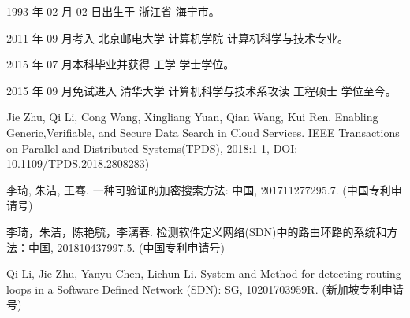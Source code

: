 \begin{resume}


  1993 年 02 月 02 日出生于 浙江省 海宁市。

  2011 年 09 月考入 北京邮电大学 计算机学院 计算机科学与技术专业。

  2015 年 07 月本科毕业并获得 工学 学士学位。

  2015 年 09 月免试进入 清华大学 计算机科学与技术系攻读 工程硕士 学位至今。



  \begin{publications}[before=\publicationskip,after=\publicationskip]
    \item Jie Zhu, Qi Li, Cong Wang, Xingliang Yuan, Qian Wang, Kui Ren. Enabling Generic,Verifiable, and Secure Data Search in Cloud Services. IEEE Transactions on Parallel and Distributed Systems(TPDS), 2018:1-1, DOI: 10.1109/TPDS.2018.2808283)
  \end{publications}


  \begin{achievements}
    \item 李琦, 朱洁, 王骞. 一种可验证的加密搜索方法: 中国, 201711277295.7. (中国专利申请号)
    \item 李琦，朱洁，陈艳毓，李漓春. 检测软件定义网络(SDN)中的路由环路的系统和方法：中国, 201810437997.5. (中国专利申请号)
    \item Qi Li, Jie Zhu, Yanyu Chen, Lichun Li. System and Method for detecting routing loops in a Software Defined Network (SDN): SG, 10201703959R. (新加坡专利申请号)
  \end{achievements}

\end{resume}
